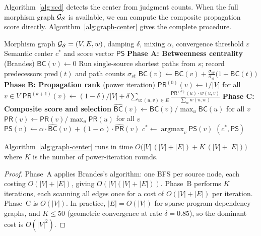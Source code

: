 \documentclass[11pt]{article}
\newcommand{\MG}{\mathcal{G}_{\Site}}       %
\newcommand{\BC}{\mathsf{BC}}               %
\newcommand{\PRank}{\mathsf{PR}}            %
\newcommand{\PropScore}{\mathsf{PS}}        %
\newcommand{\wt}{w}                         %
\begin{document}
Algorithm~\ref{alg:scd} detects the center from judgment counts.  When
the full morphism graph $\MG$ is available, we can compute the composite
propagation score directly.  Algorithm~\ref{alg:graph-center} gives the
complete procedure.

\begin{algorithm}[h]
\caption{Graph-based semantic center computation}
\label{alg:graph-center}
\begin{algorithmic}[1]
\Require Morphism graph $\MG = (V, E, \wt)$, damping $\delta$,
         mixing $\alpha$, convergence threshold $\varepsilon$
\Ensure Semantic center $c^*$ and score vector $\PropScore$
\Statex \textbf{Phase A: Betweenness centrality} (Brandes)
  \State $\BC(v) \gets 0$
\EndFor
{}
  \State Run single-source shortest paths from $s$; record
         predecessors $\mathrm{pred}(t)$ and path counts $\sigma_{st}$
      \State $\BC(v) \gets \BC(v) +
             \frac{\sigma_{sv}}{\sigma_{st}}
             \bigl(1 + \BC(t)\bigr)$
    \EndFor
  \EndFor
\EndFor
\Statex \textbf{Phase B: Propagation rank} (power iteration)
\State $\PRank^{(0)}(v) \gets 1/|V|$ for all $v \in V$
\Repeat
    \State $\PRank^{(k+1)}(v) \gets (1-\delta)/|V|
           + \delta \sum_{u:(u,v)\in E}
             \frac{\PRank^{(k)}(u) \cdot \wt(u,v)}{\sum_w \wt(u,w)}$
  \EndFor
\Until{$\|\PRank^{(k+1)} - \PRank^{(k)}\|_1 < \varepsilon$}
\Statex \textbf{Phase C: Composite score and selection}
\State $\widehat{\BC}(v) \gets \BC(v) / \max_u \BC(u)$ for all $v$
\State $\widehat{\PRank}(v) \gets \PRank(v) / \max_u \PRank(u)$ for all $v$
  \State $\PropScore(v) \gets \alpha \cdot \widehat{\BC}(v)
         + (1-\alpha) \cdot \widehat{\PRank}(v)$
\EndFor
\State $c^* \gets \operatorname{argmax}_v \PropScore(v)$
\Return $(c^*, \PropScore)$
\end{algorithmic}
\end{algorithm}

\begin{proposition}[Complexity]\label{prop:complexity}
Algorithm~\ref{alg:graph-center} runs in time
$O\!\bigl(|V|\,(|V| + |E|) + K\,(|V| + |E|)\bigr)$
where $K$ is the number of power-iteration rounds.
\end{proposition}
\begin{proof}
Phase~A applies Brandes's algorithm: one BFS per source node, each
costing $O(|V| + |E|)$, giving $O(|V|(|V|+|E|))$.  Phase~B performs
$K$ iterations, each scanning all edges once for a cost of
$O(|V| + |E|)$ per iteration.  Phase~C is $O(|V|)$.  In practice,
$|E| = O(|V|)$ for sparse program dependency graphs, and $K \leq 50$
(geometric convergence at rate $\delta = 0.85$), so the dominant cost
is $O(|V|^2)$.
\end{proof}
\end{document}
